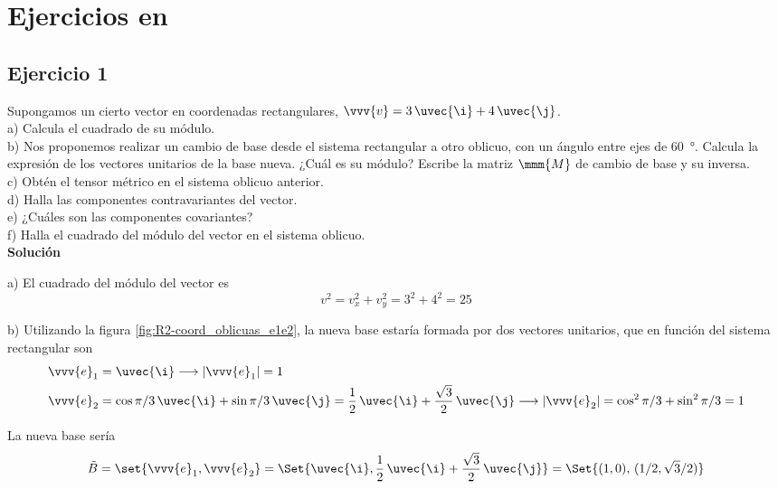 %

\chapter{Ejercicios en }

\section{Ejercicio 1}
\noindent Supongamos un cierto vector en coordenadas rectangulares,
$\vvv{v} = 3\,\uvec{\i} + 4\,\uvec{\j}$.\\
a) Calcula el cuadrado de su módulo.\\
b) Nos proponemos realizar un cambio de base desde el sistema rectangular a otro oblicuo,
con un ángulo entre ejes de \qty{60}{\degree}. Calcula la expresión de los vectores
unitarios de la base nueva. ¿Cuál es su módulo?
Escribe la matriz $\mmm{M}$ de cambio de base y su inversa.\\
c) Obtén el tensor métrico en el sistema oblicuo anterior.\\
d) Halla las componentes contravariantes del vector.\\
e) ¿Cuáles son las componentes covariantes?\\
f) Halla el cuadrado del módulo del vector en el sistema oblicuo.\\

\noindent
\textbf{Solución}

\noindent
a) El cuadrado del módulo del vector es
\[
  v^2 = v_x^2 + v_y^2 = 3^2 + 4^2 = 25
\]

\noindent
b) Utilizando la figura \ref{fig:R2-coord_oblicuas_e1e2}, la nueva base estaría formada
por dos vectores unitarios, que en función del sistema rectangular son
\begin{align*}
  \vvv{e}_1 &= \uvec{\i}
  \longrightarrow |\vvv{e}_1| = 1\\ 
  \vvv{e}_2 &= \cos\pi/3\,\uvec{\i} + \sin\pi/3\,\uvec{\j}
               = \dfrac{1}{2}\,\uvec{\i} + \dfrac{\sqrt{3}}{2}\,\uvec{\j}
               \longrightarrow |\vvv{e}_2| = \cos^2\pi/3 + \sin^2\pi/3 = 1
\end{align*}

La nueva base sería
\[
  \tilde{B} = \set{\vvv{e}_1, \vvv{e}_2}
  = \Set{\uvec{\i}, \dfrac{1}{2}\,\uvec{\i} + \dfrac{\sqrt{3}}{2}\,\uvec{\j}}
  = \Set{(1,0),\, (1/2, \sqrt{3}/2)}
\]

